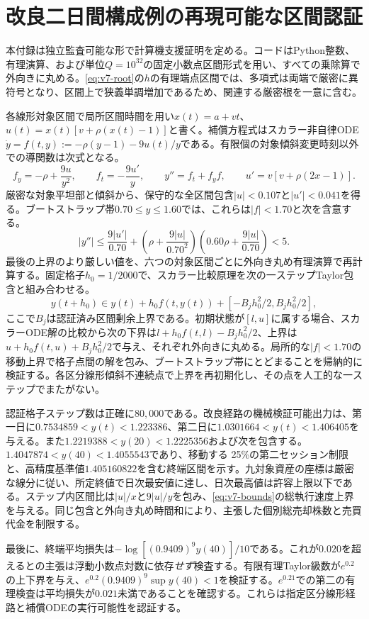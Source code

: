 \documentclass[11pt]{article}
\numberwithin{equation}{section}
\theoremstyle{definition}
\theoremstyle{remark}
\begin{document}
\section{改良二日間構成例の再現可能な区間認証}\label{app:v7certificate}
本付録は独立監査可能な形で計算機支援証明を定める。コードはPython整数、有理演算、および単位$Q=10^{32}$の固定小数点区間形式を用い、すべての乗除算で外向きに丸める。\eqref{eq:v7-root}の$h$の有理端点区間では、多項式は両端で厳密に異符号となり、区間上で狭義単調増加であるため、関連する厳密根を一意に含む。

各線形対象区間で局所区間時間を用い$x(t)=a+vt$、$u(t)=x(t)[v+\rho(x(t)-1)]$と書く。補償方程式はスカラー非自律ODE$\dot y=f(t,y):=-\rho(y-1)-9u(t)/y$である。有限個の対象傾斜変更時刻以外での導関数は次式となる。
\[
f_y=-\rho+\frac{9u}{y^2},\qquad f_t=-\frac{9u'}y,\qquad
 y''=f_t+f_y f,\qquad u'=v[v+\rho(2x-1)].
\]
厳密な対象平坦部と傾斜から、保守的な全区間包含$|u|<0.107$と$|u'|<0.041$を得る。ブートストラップ帯$0.70\le y\le1.60$では、これらは$|f|<1.70$と次を含意する。
\[
|y''|\le\frac{9|u'|}{0.70}
+\left(\rho+\frac{9|u|}{0.70^2}\right)
\left(0.60\rho+\frac{9|u|}{0.70}\right)<5.
\]
最後の上界のより厳しい値を、六つの対象区間ごとに外向き丸め有理演算で再計算する。固定格子$h_0=1/2000$で、スカラー比較原理を次の一ステップTaylor包含と組み合わせる。
\[
 y(t+h_0)\in y(t)+h_0 f(t,y(t))+[-B_j h_0^2/2,B_j h_0^2/2],
\]
ここで$B_j$は認証済み区間剰余上界である。初期状態が$[l,u]$に属する場合、スカラーODE解の比較から次の下界は$l+h_0 f(t,l)-B_jh_0^2/2$、上界は$u+h_0 f(t,u)+B_jh_0^2/2$で与え、それぞれ外向きに丸める。局所的な$|f|<1.70$の移動上界で格子点間の解を包み、ブートストラップ帯にとどまることを帰納的に検証する。各区分線形傾斜不連続点で上界を再初期化し、その点を人工的な一ステップでまたがない。

認証格子ステップ数は正確に$80,000$である。改良経路の機械検証可能出力は、第一日に$0.7534859<y(t)<1.223386$、第二日に$1.0301664<y(t)<1.406405$を与える。また$1.2219388<y(20)<1.2225356$および次を包含する。
$1.4047874<y(40)<1.4055543$であり、移動する 25\%の第二セッション制限と、高精度基準値$1.405160822$を含む終端区間を示す。九対象資産の座標は厳密な線分に従い、所定終値で日次最安値に達し、日次最高値は許容上限以下である。ステップ内区間比は$|u|/x$と$9|u|/y$を包み、\eqref{eq:v7-bounds}の総執行速度上界を与える。同じ包含と外向き丸め時間和により、主張した個別総売却株数と売買代金を制限する。

最後に、終端平均損失は$-\log[(0.9409)^9 y(40)]/10$である。これが$0.020$を超えるとの主張は浮動小数点対数に依存\emph{せず}検査する。有限有理Taylor級数が$e^{0.2}$の上下界を与え、$e^{0.2}(0.9409)^9\sup y(40)<1$を検証する。$e^{0.21}$での第二の有理検査は平均損失が$0.021$未満であることを確認する。これらは指定区分線形経路と補償ODEの実行可能性を認証する。



\end{document}
